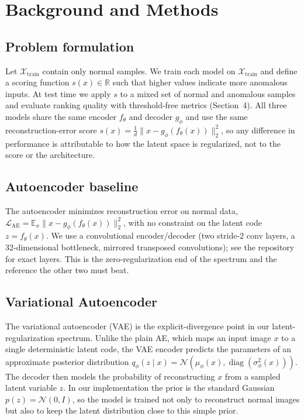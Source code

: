 \documentclass[11pt]{article}
\begin{document}
\section{Background and Methods}
\subsection{Problem formulation}   %
Let $\mathcal{X}_{\text{train}}$ contain only normal samples. We train each
model on $\mathcal{X}_{\text{train}}$ and define a scoring function
$s(x)\in\mathbb{R}$ such that higher values indicate more anomalous inputs. At
test time we apply $s$ to a mixed set of normal and anomalous samples and
evaluate ranking quality with threshold-free metrics (Section~4). All three
models share the same encoder $f_\theta$ and decoder $g_\phi$ and use the same
reconstruction-error score
$s(x)=\tfrac{1}{d}\lVert x-g_\phi(f_\theta(x))\rVert_2^2$,
so any difference in performance is attributable to how the latent space is
regularized, not to the score or the architecture.

\subsection{Autoencoder baseline}   %
The autoencoder minimizes reconstruction error on normal data,
$\mathcal{L}_{\text{AE}}=\mathbb{E}_x\lVert x-g_\phi(f_\theta(x))\rVert_2^2$,
with no constraint on the latent code $z=f_\theta(x)$. We use a convolutional
encoder/decoder (two stride-2 conv layers, a 32-dimensional bottleneck, mirrored
transposed convolutions); see the repository for exact layers. This is the
zero-regularization end of the spectrum and the reference the other two must beat.


\subsection{Variational Autoencoder}   %
The variational autoencoder (VAE) is the explicit-divergence point in our
latent-regularization spectrum. Unlike the plain AE, which maps an input image
$x$ to a single deterministic latent code, the VAE encoder predicts the
parameters of an approximate posterior distribution
$q_{\phi}(z\mid x)=\mathcal{N}(\mu_{\phi}(x),\operatorname{diag}(\sigma^2_{\phi}(x)))$.
The decoder then models the probability of reconstructing $x$ from a sampled
latent variable $z$. In our implementation the prior is the standard Gaussian
$p(z)=\mathcal{N}(0,I)$, so the model is trained not only to reconstruct normal
images but also to keep the latent distribution close to this simple prior.
\end{document}
